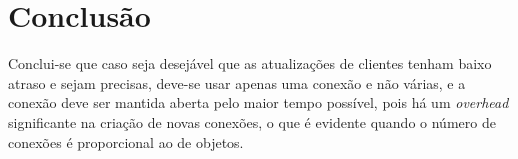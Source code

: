 \documentclass[12pt,a4paper]{article}
\begin{document}
\pagebreak \section{Conclusão}

Conclui-se que caso seja desejável que as atualizações de clientes tenham baixo
atraso e sejam precisas, deve-se usar apenas uma conexão e não várias, e a
conexão deve ser mantida aberta pelo maior tempo possível, pois há um
\textit{overhead} significante na criação de novas conexões, o que é evidente
quando o número de conexões é proporcional ao de objetos.
\end{document}
